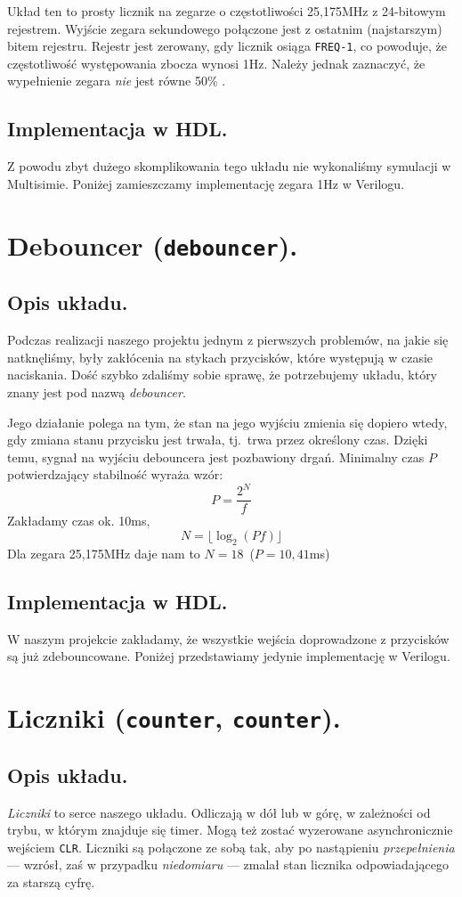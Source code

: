\documentclass[a4paper,oneside]{report}
\newcommand{\clocksec}{\texttt{clock\textunderscore sec}}
\newcommand{\debouncer}{\texttt{debouncer}}
\newcommand{\counter}[1]{\texttt{counter\textunderscore #1}}
\begin{document}
Układ ten to prosty licznik na zegarze o częstotliwości 25,175MHz
z 24-bitowym rejestrem. Wyjście zegara sekundowego połączone
jest z ostatnim (najstarszym) bitem rejestru. Rejestr jest
zerowany, gdy licznik osiąga \texttt{FREQ-1}, co powoduje, że
częstotliwość występowania zbocza wynosi 1Hz. Należy jednak
zaznaczyć, że wypełnienie zegara \emph{nie} jest równe 50\% .
\subsection{Implementacja w HDL.}
Z powodu zbyt dużego skomplikowania tego układu nie wykonaliśmy
symulacji w Multisimie. Poniżej zamieszczamy implementację zegara
1Hz w Verilogu.


\section{Debouncer (\debouncer).}
\subsection{Opis układu.}
Podczas realizacji naszego projektu jednym z pierwszych problemów,
na jakie się natknęliśmy, były zakłócenia na stykach przycisków,
które występują w czasie naciskania. Dość szybko zdaliśmy sobie
sprawę, że potrzebujemy układu, który znany jest pod nazwą
\emph{debouncer}.

Jego działanie polega na tym, że stan na jego wyjściu zmienia się
dopiero wtedy, gdy zmiana stanu przycisku jest trwała, tj.\
trwa przez określony czas. Dzięki temu, sygnał na wyjściu
debouncera jest pozbawiony drgań. Minimalny czas $P$ potwierdzający
stabilność wyraża wzór:
$$
P = \frac{2^N}{f}
$$
Zakładamy czas ok. 10ms,
$$
N = \lfloor\log_2(Pf)\rfloor
$$
Dla zegara 25,175MHz daje nam to $N=18$\ ($P=10,41$ms)
\subsection{Implementacja w HDL.}
W naszym projekcie zakładamy, że wszystkie wejścia doprowadzone z
przycisków są już zdebouncowane. Poniżej przedstawiamy jedynie
implementację w Verilogu.


\section{Liczniki (\counter{6}, \counter{10}).}
\subsection{Opis układu.}
\emph{Liczniki} to serce naszego układu. Odliczają w dół lub w
górę, w zależności od trybu, w którym znajduje się timer. Mogą też
zostać wyzerowane asynchronicznie wejściem \texttt{CLR}. Liczniki
są połączone ze sobą tak, aby po nastąpieniu \emph{przepełnienia}
--- wzrósł, zaś w przypadku \emph{niedomiaru} --- zmalał stan
licznika odpowiadającego za starszą cyfrę.
\end{document}
